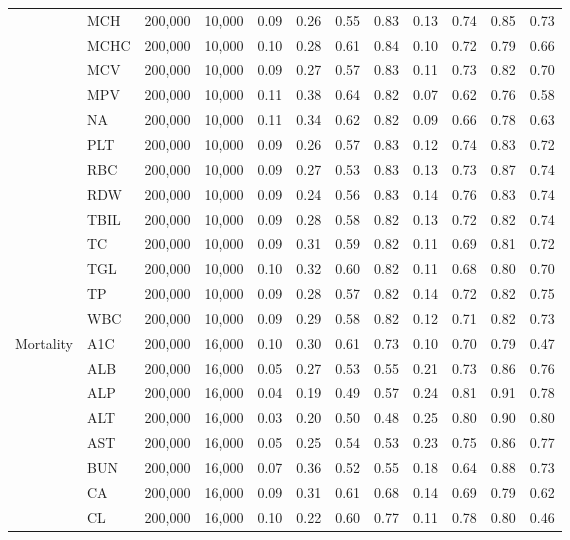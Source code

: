 \begin{table}[ht]
\begin{tabular}{llrrrrrrrrrr}
 & MCH & 200,000 & 10,000 & 0.09 & 0.26 & 0.55 & 0.83 & 0.13 & 0.74 & 0.85 & 0.73 \\
 & MCHC & 200,000 & 10,000 & 0.10 & 0.28 & 0.61 & 0.84 & 0.10 & 0.72 & 0.79 & 0.66 \\
 & MCV & 200,000 & 10,000 & 0.09 & 0.27 & 0.57 & 0.83 & 0.11 & 0.73 & 0.82 & 0.70 \\
 & MPV & 200,000 & 10,000 & 0.11 & 0.38 & 0.64 & 0.82 & 0.07 & 0.62 & 0.76 & 0.58 \\
 & NA & 200,000 & 10,000 & 0.11 & 0.34 & 0.62 & 0.82 & 0.09 & 0.66 & 0.78 & 0.63 \\
 & PLT & 200,000 & 10,000 & 0.09 & 0.26 & 0.57 & 0.83 & 0.12 & 0.74 & 0.83 & 0.72 \\
 & RBC & 200,000 & 10,000 & 0.09 & 0.27 & 0.53 & 0.83 & 0.13 & 0.73 & 0.87 & 0.74 \\
 & RDW & 200,000 & 10,000 & 0.09 & 0.24 & 0.56 & 0.83 & 0.14 & 0.76 & 0.83 & 0.74 \\
 & TBIL & 200,000 & 10,000 & 0.09 & 0.28 & 0.58 & 0.82 & 0.13 & 0.72 & 0.82 & 0.74 \\
 & TC & 200,000 & 10,000 & 0.09 & 0.31 & 0.59 & 0.82 & 0.11 & 0.69 & 0.81 & 0.72 \\
 & TGL & 200,000 & 10,000 & 0.10 & 0.32 & 0.60 & 0.82 & 0.11 & 0.68 & 0.80 & 0.70 \\
 & TP & 200,000 & 10,000 & 0.09 & 0.28 & 0.57 & 0.82 & 0.14 & 0.72 & 0.82 & 0.75 \\
 & WBC & 200,000 & 10,000 & 0.09 & 0.29 & 0.58 & 0.82 & 0.12 & 0.71 & 0.82 & 0.73 \\
\midrule
Mortality & A1C & 200,000 & 16,000 & 0.10 & 0.30 & 0.61 & 0.73 & 0.10 & 0.70 & 0.79 & 0.47 \\
 & ALB & 200,000 & 16,000 & 0.05 & 0.27 & 0.53 & 0.55 & 0.21 & 0.73 & 0.86 & 0.76 \\
 & ALP & 200,000 & 16,000 & 0.04 & 0.19 & 0.49 & 0.57 & 0.24 & 0.81 & 0.91 & 0.78 \\
 & ALT & 200,000 & 16,000 & 0.03 & 0.20 & 0.50 & 0.48 & 0.25 & 0.80 & 0.90 & 0.80 \\
 & AST & 200,000 & 16,000 & 0.05 & 0.25 & 0.54 & 0.53 & 0.23 & 0.75 & 0.86 & 0.77 \\
 & BUN & 200,000 & 16,000 & 0.07 & 0.36 & 0.52 & 0.55 & 0.18 & 0.64 & 0.88 & 0.73 \\
 & CA & 200,000 & 16,000 & 0.09 & 0.31 & 0.61 & 0.68 & 0.14 & 0.69 & 0.79 & 0.62 \\
 & CL & 200,000 & 16,000 & 0.10 & 0.22 & 0.60 & 0.77 & 0.11 & 0.78 & 0.80 & 0.46 \\

\end{tabular}
\end{table}
